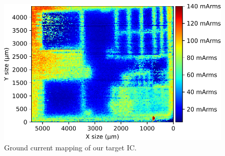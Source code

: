 
\begin{figure}[h]
	\centering
	\includegraphics[width=\columnwidth]{./figures/pos_neg_IGND.pdf}
	\caption{Ground current mapping of our target IC.}
	\label{stm_ignd}
\end{figure}
